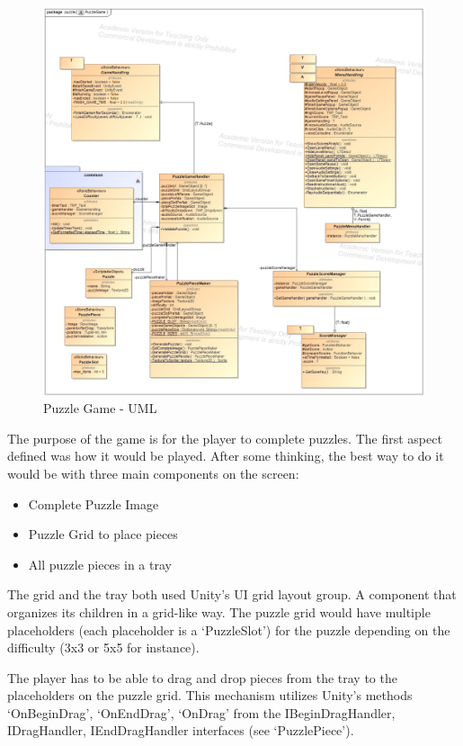 \begin{figure}[!h]
    \centering
    \includegraphics[width=\linewidth]{Chapters/new_architechture/class__puzzle__PuzzleGame.jpg}
    \caption{Puzzle Game - UML}
    \label{fig:puzzleGameArq}
\end{figure}

The purpose of the game is for the player to complete puzzles. The first aspect defined was how it would be played. After some thinking, the best way to do it would be with three main components on the screen:

\begin{itemize}
    \item Complete Puzzle Image
    \item Puzzle Grid to place pieces
    \item All puzzle pieces in a tray
\end{itemize}

The grid and the tray both used Unity's UI grid layout group. A component that organizes its children in a grid-like way. The puzzle grid would have multiple placeholders (each placeholder is a `PuzzleSlot') for the puzzle depending on the difficulty (3x3 or 5x5 for instance).

The player has to be able to drag and drop pieces from the tray to the placeholders on the puzzle grid. This mechanism utilizes Unity's methods `OnBeginDrag', `OnEndDrag', `OnDrag' from the IBeginDragHandler, IDragHandler, IEndDragHandler interfaces (see `PuzzlePiece').

